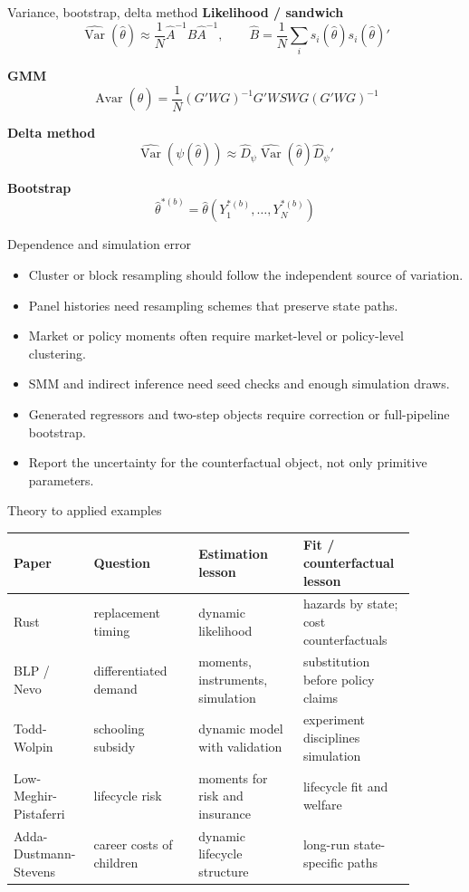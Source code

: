 \documentclass[aspectratio=169,11pt]{beamer}
\newcommand{\1}{\mathbf{1}}
\newcommand{\Var}{\operatorname{Var}}
\newcommand{\Avar}{\operatorname{Avar}}
\begin{document}
\begin{frame}{Variance, bootstrap, delta method}
\small
\textbf{Likelihood / sandwich}
\[
\widehat{\Var}(\widehat\theta)
\approx
\frac{1}{N}\widehat A^{-1}\widehat B\widehat A^{-1},
\qquad
\widehat B=\frac{1}{N}\sum_i s_i(\widehat\theta)s_i(\widehat\theta)'
\]

\textbf{GMM}
\[
\Avar(\widehat\theta)
=
\frac{1}{N}
(G'WG)^{-1}G'WSWG(G'WG)^{-1}
\]

\textbf{Delta method}
\[
\widehat{\Var}(\psi(\widehat\theta))
\approx
\widehat D_\psi
\widehat{\Var}(\widehat\theta)
\widehat D_\psi'
\]

\textbf{Bootstrap}
\[
\widehat\theta^{*(b)}
=
\widehat\theta(Y_1^{*(b)},\ldots,Y_N^{*(b)})
\]
\end{frame}

\begin{frame}{Dependence and simulation error}
\begin{itemize}
    \item Cluster or block resampling should follow the independent source of variation.
    \item Panel histories need resampling schemes that preserve state paths.
    \item Market or policy moments often require market-level or policy-level clustering.
    \item SMM and indirect inference need seed checks and enough simulation draws.
    \item Generated regressors and two-step objects require correction or full-pipeline bootstrap.
    \item Report the uncertainty for the counterfactual object, not only primitive parameters.
\end{itemize}
\end{frame}

\begin{frame}{Theory to applied examples}
\scriptsize
\begin{tabular}{p{0.16\linewidth} p{0.24\linewidth} p{0.24\linewidth} p{0.24\linewidth}}
\toprule
Paper & Question & Estimation lesson & Fit / counterfactual lesson \\
\midrule
Rust & replacement timing & dynamic likelihood & hazards by state; cost counterfactuals \\
BLP / Nevo & differentiated demand & moments, instruments, simulation & substitution before policy claims \\
Todd-Wolpin & schooling subsidy & dynamic model with validation & experiment disciplines simulation \\
Low-Meghir-Pistaferri & lifecycle risk & moments for risk and insurance & lifecycle fit and welfare \\
Adda-Dustmann-Stevens & career costs of children & dynamic lifecycle structure & long-run state-specific paths \\
\bottomrule
\end{tabular}
\end{frame}
\end{document}
